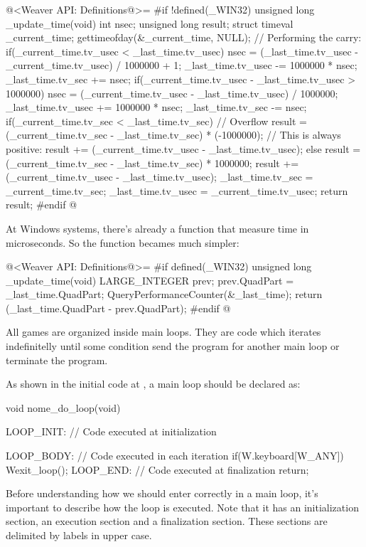 \iniciocodigo
@<Weaver API: Definitions@>=
#if !defined(_WIN32)
unsigned long _update_time(void){
  int nsec;
  unsigned long result;
  struct timeval _current_time;
  gettimeofday(&_current_time, NULL);
  // Performing the carry:
  if(_current_time.tv_usec < _last_time.tv_usec){
    nsec = (_last_time.tv_usec - _current_time.tv_usec) / 1000000 + 1;
    _last_time.tv_usec -= 1000000 * nsec;
    _last_time.tv_sec += nsec;
  }
  if(_current_time.tv_usec - _last_time.tv_usec > 1000000){
    nsec = (_current_time.tv_usec - _last_time.tv_usec) / 1000000;
    _last_time.tv_usec += 1000000 * nsec;
    _last_time.tv_sec -= nsec;
  }
  if(_current_time.tv_sec < _last_time.tv_sec){
    // Overflow
    result = (_current_time.tv_sec - _last_time.tv_sec) * (-1000000);
    // This is always positive:
    result += (_current_time.tv_usec - _last_time.tv_usec);
  }
  else{
    result = (_current_time.tv_sec - _last_time.tv_sec) * 1000000;
    result += (_current_time.tv_usec - _last_time.tv_usec);
  }
  _last_time.tv_sec = _current_time.tv_sec;
  _last_time.tv_usec = _current_time.tv_usec;
  return result;
}
#endif
@
\fimcodigo

At Windows systems, there's already a function that measure time in
microseconds. So the function becames much simpler:

\iniciocodigo
@<Weaver API: Definitions@>=
#if defined(_WIN32)
unsigned long _update_time(void){
  LARGE_INTEGER prev;
  prev.QuadPart = _last_time.QuadPart;
  QueryPerformanceCounter(&_last_time);
  return (_last_time.QuadPart - prev.QuadPart);
}
#endif
@
\fimcodigo


All games are organized inside main loops. They are code which
iterates indefinitelly until some condition send the program for
another main loop or terminate the program.

As shown in the initial code at , a main loop
should be declared as:

\alinhaverbatim
void nome\_do\_loop(void){
 LOOP\_INIT: // Code executed at initialization

 LOOP\_BODY: // Code executed in each iteration
    if(W.keyboard[W\_ANY])
        Wexit\_loop();
 LOOP\_END: // Code executed at finalization
    return;
}
\alinhanormal

Before understanding how we should enter correctly in a main loop,
it's important to describe how the loop is executed. Note that it has
an initialization section, an execution section and a finalization
section. These sections are delimited by labels in upper case.

